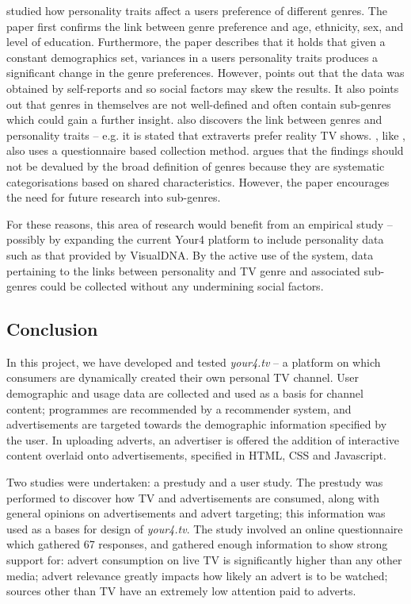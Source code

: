 	\citet{rentfrow2010listening} studied how personality traits affect a users preference of different genres. The paper first confirms the link between genre preference and age, ethnicity, sex, and level of education. Furthermore, the paper describes that it holds that given a constant demographics set, variances in a users personality traits produces a significant change in the genre preferences. However, \citeauthor{rentfrow2010listening} points out that the data was obtained by self-reports and so social factors may skew the results. It also points out that genres in themselves are not well-defined and often contain sub-genres which could gain a further insight. \citet{shim2007effects} also discovers the link between genres and personality traits -- e.g. it is stated that extraverts prefer reality TV shows. \citeauthor{shim2007effects}, like \citeauthor{rentfrow2010listening}, also uses a questionnaire based collection method. \citeauthor{shim2007effects} argues that the findings should not be devalued by the broad definition of genres because they are systematic categorisations based on shared characteristics. However, the paper encourages the need for future research into sub-genres.

	For these reasons, this area of research would benefit from an empirical study -- possibly by expanding the current Your4 platform to include personality data such as that provided by VisualDNA. By the active use of the system, data pertaining to the links between personality and TV genre and associated sub-genres could be collected without any undermining social factors.

\subsection{Conclusion}

% 

In this project, we have developed and tested \textit{your4.tv} -- a platform on which consumers are dynamically created their own personal TV channel. User demographic and usage data are collected and used as a basis for channel content; programmes are recommended by a recommender system, and advertisements are targeted towards the demographic information specified by the user. In uploading adverts, an advertiser is offered the addition of interactive content overlaid onto advertisements, specified in HTML, CSS and Javascript.

Two studies were undertaken: a prestudy and a user study. The prestudy was performed to discover how TV and advertisements are consumed, along with general opinions on advertisements and advert targeting; this information was used as a bases for design of \textit{your4.tv}. The study involved an online questionnaire which gathered 67 responses, and gathered enough information to show strong support for: advert consumption on live TV is significantly higher than any other media; advert relevance greatly impacts how likely an advert is to be watched; sources other than TV have an extremely low attention paid to adverts.


